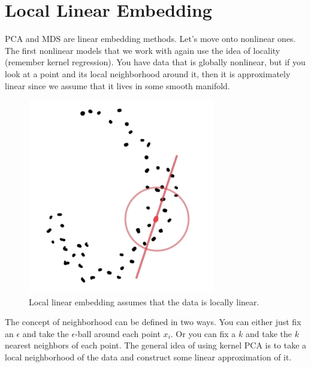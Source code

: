 \section{Local Linear Embedding} 

  PCA and MDS are linear embedding methods. Let's move onto nonlinear ones. The first nonlinear models that we work with again use the idea of locality (remember kernel regression). You have data that is globally nonlinear, but if you look at a point and its local neighborhood around it, then it is approximately linear since we assume that it lives in some smooth manifold. 

  \begin{figure}[H]
    \centering 
    \includegraphics[scale=0.4]{img/local_linear_embedding.png}
    \caption{Local linear embedding assumes that the data is locally linear. } 
    \label{fig:local_linear_embedding}
  \end{figure}

  The concept of neighborhood can be defined in two ways. You can either just fix an $\epsilon$ and take the $\epsilon$-ball around each point $x_i$. Or you can fix a $k$ and take the $k$ nearest neighbors of each point. The general idea of using kernel PCA is to take a local neighborhood of the data and construct some linear approximation of it. 

